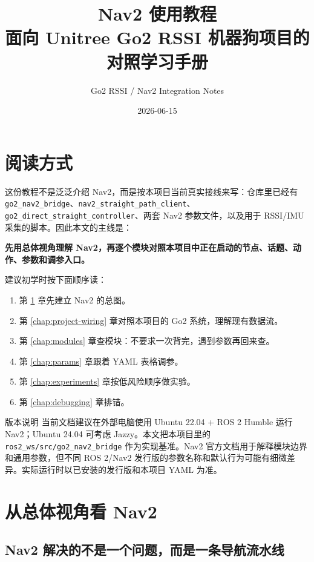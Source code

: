 \documentclass[UTF8,11pt,a4paper,openany]{ctexrep}
\title{
  \Huge Nav2 使用教程\\
  \Large 面向 Unitree Go2 RSSI 机器狗项目的对照学习手册
}
\author{Go2 RSSI / Nav2 Integration Notes}
\date{2026-06-15}
\newcommand{\file}[1]{\nolinkurl{#1}}
\newcommand{\pkg}[1]{\nolinkurl{#1}}
\begin{document}
\maketitle
\tableofcontents

\chapter*{阅读方式}

这份教程不是泛泛介绍 Nav2，而是按本项目当前真实接线来写：仓库里已经有 \pkg{go2_nav2_bridge}、\pkg{nav2_straight_path_client}、\pkg{go2_direct_straight_controller}、两套 Nav2 参数文件，以及用于 RSSI/IMU 采集的脚本。因此本文的主线是：

\begin{center}
  \textbf{先用总体视角理解 Nav2，再逐个模块对照本项目中正在启动的节点、话题、动作、参数和调参入口。}
\end{center}

建议初学时按下面顺序读：

\begin{enumerate}
  \item 第 \ref{chap:big-picture} 章先建立 Nav2 的总图。
  \item 第 \ref{chap:project-wiring} 章对照本项目的 Go2 系统，理解现有数据流。
  \item 第 \ref{chap:modules} 章查模块：不要求一次背完，遇到参数再回来查。
  \item 第 \ref{chap:params} 章跟着 YAML 表格调参。
  \item 第 \ref{chap:experiments} 章按低风险顺序做实验。
  \item 第 \ref{chap:debugging} 章排错。
\end{enumerate}

\begin{notebox}{版本说明}
当前文档建议在外部电脑使用 Ubuntu 22.04 + ROS 2 Humble 运行 Nav2；Ubuntu 24.04 可考虑 Jazzy。本文把本项目里的 \file{ros2_ws/src/go2_nav2_bridge} 作为实现基准。Nav2 官方文档用于解释模块边界和通用参数，但不同 ROS 2/Nav2 发行版的参数名称和默认行为可能有细微差异。实际运行时以已安装的发行版和本项目 YAML 为准。
\end{notebox}

\chapter{从总体视角看 Nav2}
\label{chap:big-picture}

\section{Nav2 解决的不是一个问题，而是一条导航流水线}
\end{document}
